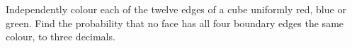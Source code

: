 Independently colour each of the twelve edges of a cube uniformly red, blue or green. Find the probability that no face has all four boundary edges the same colour, to three decimals.
